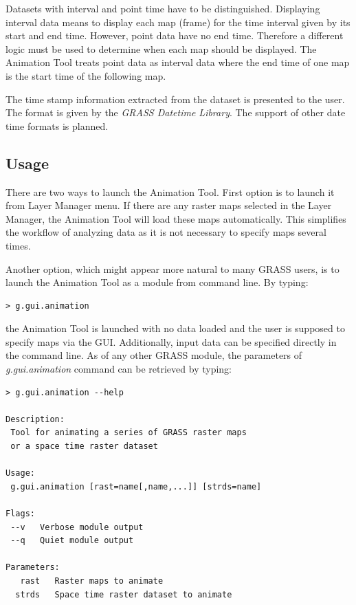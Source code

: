 \documentclass[a4paper,12pt,oneside]{book}
\newcommand{\module}[1]{\textsl{#1}}
\newcommand{\at}{Animation Tool\xspace}
\begin{document}
Datasets with interval and point time have to be distinguished.
Displaying interval data means to display each map (frame) for the time interval given by its start and end time.
However, point data have no end time. Therefore a different logic must be used to determine when each map should be displayed.
The \at treats point data as interval data where the end time of one map is the start time of the following map.

The time stamp information extracted from the dataset is presented to the user.
The format is given by the \emph{GRASS Datetime Library}. %
The support of other date time formats is planned.


\subsection{Usage}
There are two ways to launch the \at.
First option is to launch it from Layer Manager menu.
If there are any raster maps selected in the Layer Manager, the \at will load these maps automatically.
This simplifies the workflow of analyzing data as it is not necessary to specify maps several times.

Another option, which might appear more natural to many GRASS users,
is to launch the \at as a module from command line. By typing:

\begin{small}
\begin{lstlisting}[style=mybash]
> g.gui.animation
\end{lstlisting}
\end{small}
the \at is launched with no data loaded and the user is supposed to specify maps via the GUI.
Additionally, input data can be specified directly in the command line.
As of any other GRASS module, the parameters of \module{g.gui.animation} command can be retrieved by typing:

\begin{small}
\begin{lstlisting}[style=mybash]
> g.gui.animation --help

Description:
 Tool for animating a series of GRASS raster maps
 or a space time raster dataset

Usage:
 g.gui.animation [rast=name[,name,...]] [strds=name]

Flags:
 --v   Verbose module output
 --q   Quiet module output

Parameters:
   rast   Raster maps to animate
  strds   Space time raster dataset to animate
\end{lstlisting}
\end{small}
\end{document}
